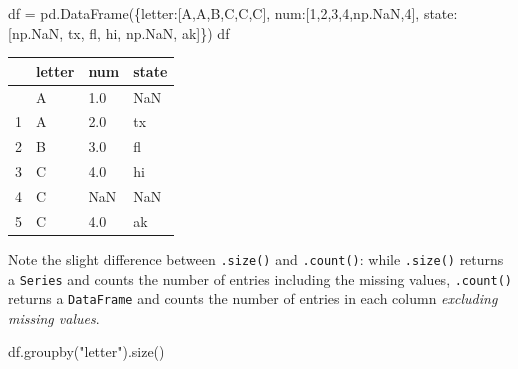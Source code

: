 \documentclass[
  letterpaper,
  DIV=11,
  numbers=noendperiod]{scrreprt}
\newenvironment{Shaded}{\begin{snugshade}}{\end{snugshade}}
\newcommand{\DecValTok}[1]{\textcolor[rgb]{0.68,0.00,0.00}{#1}}
\newcommand{\NormalTok}[1]{\textcolor[rgb]{0.00,0.23,0.31}{#1}}
\newcommand{\OperatorTok}[1]{\textcolor[rgb]{0.37,0.37,0.37}{#1}}
\newcommand{\StringTok}[1]{\textcolor[rgb]{0.13,0.47,0.30}{#1}}
\begin{document}
\begin{Shaded}
\begin{Highlighting}[]
\NormalTok{df }\OperatorTok{=}\NormalTok{ pd.DataFrame(\{}\StringTok{\textquotesingle{}letter\textquotesingle{}}\NormalTok{:[}\StringTok{\textquotesingle{}A\textquotesingle{}}\NormalTok{,}\StringTok{\textquotesingle{}A\textquotesingle{}}\NormalTok{,}\StringTok{\textquotesingle{}B\textquotesingle{}}\NormalTok{,}\StringTok{\textquotesingle{}C\textquotesingle{}}\NormalTok{,}\StringTok{\textquotesingle{}C\textquotesingle{}}\NormalTok{,}\StringTok{\textquotesingle{}C\textquotesingle{}}\NormalTok{], }
                   \StringTok{\textquotesingle{}num\textquotesingle{}}\NormalTok{:[}\DecValTok{1}\NormalTok{,}\DecValTok{2}\NormalTok{,}\DecValTok{3}\NormalTok{,}\DecValTok{4}\NormalTok{,np.NaN,}\DecValTok{4}\NormalTok{], }
                   \StringTok{\textquotesingle{}state\textquotesingle{}}\NormalTok{:[np.NaN, }\StringTok{\textquotesingle{}tx\textquotesingle{}}\NormalTok{, }\StringTok{\textquotesingle{}fl\textquotesingle{}}\NormalTok{, }\StringTok{\textquotesingle{}hi\textquotesingle{}}\NormalTok{, np.NaN, }\StringTok{\textquotesingle{}ak\textquotesingle{}}\NormalTok{]\})}
\NormalTok{df}
\end{Highlighting}
\end{Shaded}

\begin{longtable}[]{@{}llll@{}}
\toprule\noalign{}
& letter & num & state \\
\midrule\noalign{}
\endhead
\bottomrule\noalign{}
\endlastfoot
0 & A & 1.0 & NaN \\
1 & A & 2.0 & tx \\
2 & B & 3.0 & fl \\
3 & C & 4.0 & hi \\
4 & C & NaN & NaN \\
5 & C & 4.0 & ak \\
\end{longtable}

Note the slight difference between \texttt{.size()} and
\texttt{.count()}: while \texttt{.size()} returns a \texttt{Series} and
counts the number of entries including the missing values,
\texttt{.count()} returns a \texttt{DataFrame} and counts the number of
entries in each column \emph{excluding missing values}.

\begin{Shaded}
\begin{Highlighting}[]
\NormalTok{df.groupby(}\StringTok{"letter"}\NormalTok{).size()}
\end{Highlighting}
\end{Shaded}
\end{document}
